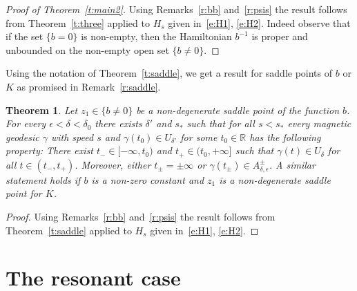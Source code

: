 \documentclass[10pt]{amsart}
\newtheorem{theo}[cdrthm]{Theorem}
\theoremstyle{definition}
\newcommand{\R}{\mathbb{R}}
\begin{document}
\begin{proof}[Proof of Theorem~\ref{t:main2}]
Using Remarks~\ref{r:bb} and~\ref{r:psis} the result follows from Theorem~\ref{t:three} applied to $H_s$ given in~\eqref{e:H1}, \eqref{e:H2}. Indeed observe that if the set $\{b=0\}$ is non-empty, then the Hamiltonian $b^{-1}$ is proper and unbounded on the non-empty open set $\{b\neq0\}$.
\end{proof}

Using the notation of Theorem~\ref{t:saddle}, we get a result for saddle points of $b$ or $K$ as promised in Remark~\ref{r:saddle}.

\begin{theo}\label{t:saddlemag}
Let $z_1\in\{b\neq0\}$ be a non-degenerate saddle point of the function $b$. For every $\epsilon<\delta<\delta_0$ there exists $\delta'$ and $s_*$ such that for all $s<s_*$ every magnetic geodesic $\gamma$ with speed $s$ and $\gamma(t_0)\in U_{\delta'}$ for some $t_0\in \R$ has the following property: There exist $t_-\in[-\infty,t_0)$ and $t_+\in(t_0,+\infty]$ such that $\gamma(t)\in U_\delta$ for all $t\in(t_-,t_+)$. Moreover, either $t_\pm=\pm\infty$ or $\gamma(t_\pm)\in A^\pm_{\delta,\epsilon}$. A similar statement holds if $b$ is a non-zero constant and $z_1$ is a non-degenerate saddle point for $K$.
\end{theo}


\begin{proof}
Using Remarks~\ref{r:bb} and~\ref{r:psis} the result follows from Theorem~\ref{t:saddle} applied to $H_s$ given in~\eqref{e:H1}, \eqref{e:H2}.
\end{proof}



\section{The resonant case}\label{s:resonant}
\end{document}
